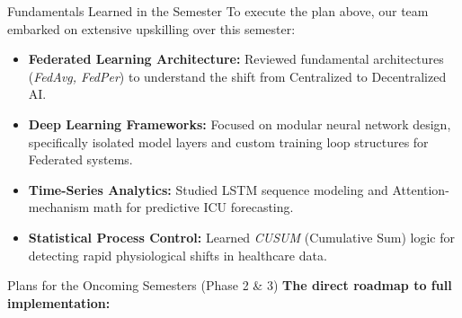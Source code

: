\documentclass[aspectratio=169, 11pt]{beamer}
\begin{document}
\begin{frame}{Fundamentals Learned in the Semester}
    To execute the plan above, our team embarked on extensive upskilling over this semester:
    \vspace{0.3cm}
    \begin{itemize}
        \item \textbf{Federated Learning Architecture:} Reviewed fundamental architectures (\textit{FedAvg, FedPer}) to understand the shift from Centralized to Decentralized AI.
        \item \textbf{Deep Learning Frameworks:} Focused on modular neural network design, specifically isolated model layers and custom training loop structures for Federated systems.
        \item \textbf{Time-Series Analytics:} Studied LSTM sequence modeling and Attention-mechanism math for predictive ICU forecasting.
        \item \textbf{Statistical Process Control:} Learned \textit{CUSUM} (Cumulative Sum) logic for detecting rapid physiological shifts in healthcare data.
    \end{itemize}
\end{frame}

\begin{frame}{Plans for the Oncoming Semesters (Phase 2 \& 3)}
    \textbf{The direct roadmap to full implementation:}
    \vspace{0.3cm}
    \begin{table}
        \centering
        \small
    \end{table}
\end{frame}
\end{document}
